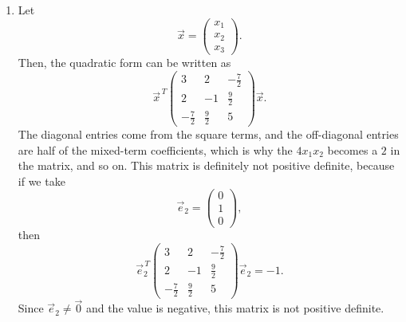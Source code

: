 \documentclass[10pt]{extarticle}
\begin{document}
\begin{enumerate}[label=(\alph*)]
\item Let
\[
\vec{x}=
\begin{pmatrix}
x_1\\
x_2\\
x_3
\end{pmatrix}.
\]
Then, the quadratic form can be written as
\[
\vec{x}^{\,T}
\begin{pmatrix}
3 & 2 & -\frac{7}{2}\\[0.3em]
2 & -1 & \frac{9}{2}\\[0.3em]
-\frac{7}{2} & \frac{9}{2} & 5
\end{pmatrix}
\vec{x}.
\]
The diagonal entries come from the square terms, and the off-diagonal entries are half of the mixed-term coefficients, which is why the $4x_1x_2$ becomes a $2$ in the matrix, and so on. This matrix is definitely not positive definite, because if we take
\[
\vec{e}_2=
\begin{pmatrix}
0\\
1\\
0
\end{pmatrix},
\]
then
\[
\vec{e}_2^{\,T}
\begin{pmatrix}
3 & 2 & -\frac{7}{2}\\[0.3em]
2 & -1 & \frac{9}{2}\\[0.3em]
-\frac{7}{2} & \frac{9}{2} & 5
\end{pmatrix}
\vec{e}_2=-1.
\]
Since $\vec{e}_2\neq \vec{0}$ and the value is negative, this matrix is not positive definite.


\end{enumerate}
\end{document}
